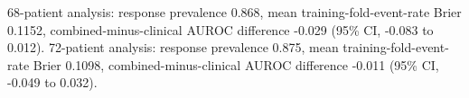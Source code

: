 \begin{table}[htbp]
68-patient analysis: response prevalence 0.868, mean training-fold-event-rate Brier 0.1152, combined-minus-clinical AUROC difference -0.029 (95\% CI, -0.083 to 0.012). 72-patient analysis: response prevalence 0.875, mean training-fold-event-rate Brier 0.1098, combined-minus-clinical AUROC difference -0.011 (95\% CI, -0.049 to 0.032).
\end{table}
